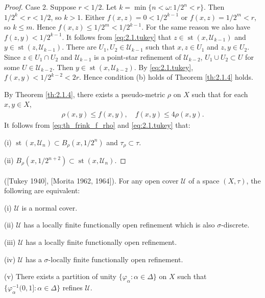 \documentclass[main.tex]{subfiles}
\begin{document}
\begin{proof}
Case 2. Suppose $r <1/2$. Let $k = \min\{n< \omega: 1/{2^n} < r\}$.
Then $1/{2^k} < r < 1/2$, so $k > 1$. Either $f(x, z) = 0 < 1/{2^{k-1}}$ or 
$f(x, z) = 1/{2^m} < r$, so $k \le m$. Hence $f(x, z) \le 1/{2^m} < 1/2^{k-1}$.
For the same reason we also have $f(z, y) < 1/{2^{k-1}}$. 
It follows from \eqref{eq:2.1.tukey} that $z \in \operatorname{st}(x, \mathscr{U}_{k-1})$ 
and $y \in \operatorname{st}(z, \mathscr{U}_{k-1})$. 
There are $U_1, U_2 \in \mathscr{U}_{k-1}$ such that $x, z \in U_1$ 
and $z, y \in U_2$. Since $z \in U_1 \cap U_2$ 
and $\mathscr{U}_{k-1}$ is a point-star refinement of $\mathscr{U}_{k-2}$, 
$U_1 \cup U_2 \subset U$ for some $U \in \mathscr{U}_{k-2}$. 
Then $y \in \operatorname{st}(x, \mathscr{U}_{k-2})$. 
By \eqref{eq:2.1.tukey}, 
$f(x, y) < 1/{2^{k-2}} < 2r$.
Hence condition (b) holds of Theorem \ref{th:2.1.4} holds.

By Theorem \ref{th:2.1.4}, there exists a pseudo-metric $\rho$ on $X$ such that for each $x, y \in X$,
 \begin{gather}
 \rho(x, y) \le f(x, y), \quad
f(x, y) \le 4\rho(x, y). \label{eq:th_frink_f_rho}
\end{gather}
It follows from \eqref{eq:th_frink_f_rho} and \eqref{eq:2.1.tukey} that:

\textup{(i)} $\operatorname{st}(x, \mathscr{U}_n) \subset B_\rho(x,1/{2^n})$ and $\tau_\rho \subset \tau$.

\textup{(ii)} $B_\rho(x, 1/{2^{n+2}}) \subset \operatorname{st}(x, \mathscr{U}_n)$.
\end{proof}

{\theorem{\label{th:2.1.6}}
	\textup{([Tukey 1940]\textsuperscript{\cite{Tukey}}, 
		[Morita 1962, 1964]\textsuperscript{\cite{Morita1962}\cite{Morita1964}})}. 
	For any open cover $\mathscr{U}$ of a space $(X, \tau)$, 
	the following are equivalent:

\textup{(i)}   $\mathscr{U}$ is a normal cover.

\textup{(ii)}  $\mathscr{U}$ has a locally finite  functionally open refinement 
which is also $\sigma$-discrete.

\textup{(iii)}  $\mathscr{U}$ has a locally finite functionally open refinement.

\textup{(iv)}  $\mathscr{U}$ has a $\sigma$-locally finite functionally open refinement.

\textup{(v)}  There exists a partition of unity $\{\varphi_\alpha: \alpha \in \Delta\}$ on $X$ 
such that $\{\varphi_\alpha^{-1}(0, 1]: \alpha \in \Delta\}$ refines $\mathscr{U}$.
}
\end{document}
